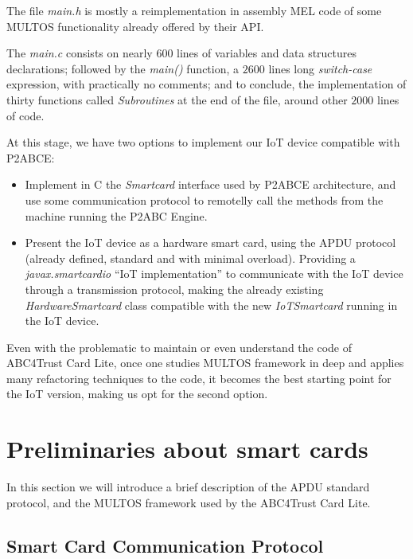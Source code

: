 The file \textit{main.h} is mostly a reimplementation in assembly MEL code of some MULTOS functionality already offered by their API.

The \textit{main.c} consists on nearly $600$ lines of variables and data structures declarations; followed by the \textit{main()} function, a $2600$ lines long \textit{switch-case} expression, with practically no comments; and to conclude, the implementation of thirty functions called \textit{Subroutines} at the end of the file, around other $2000$ lines of code.

\hfil

At this stage, we have two options to implement our IoT device compatible with P2ABCE:

\begin{itemize}
	\item Implement in C the \textit{Smartcard} interface used by P2ABCE architecture, and use some communication protocol to remotelly call the methods from the machine running the P2ABC Engine.
	\item Present the IoT device as a hardware smart card, using the APDU protocol (already defined, standard and with minimal overload). Providing a \textit{javax.smartcardio} ``IoT implementation'' to communicate with the IoT device through a transmission protocol, making the already existing \textit{HardwareSmartcard} class compatible with the new \textit{IoTSmartcard} running in the IoT device.
\end{itemize}

Even with the problematic to maintain or even understand the code of ABC4Trust Card Lite, once one studies MULTOS framework in deep and applies many refactoring techniques to the code, it becomes the best starting point for the IoT version, making us opt for the second option.





\section{Preliminaries about smart cards}

In this section we will introduce a brief description of the APDU standard protocol, and the MULTOS framework used by the ABC4Trust Card Lite.


\subsection{Smart Card Communication Protocol}\label{subsec:APDU}

